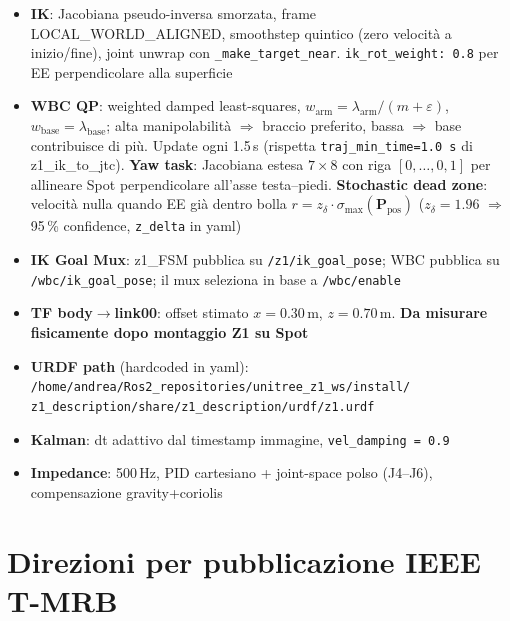 \documentclass[a4paper,11pt]{article}
\begin{document}
\begin{itemize}
  \item \textbf{IK}: Jacobiana pseudo-inversa smorzata, frame LOCAL\_WORLD\_ALIGNED,
        smoothstep quintico (zero velocità a inizio/fine),
        joint unwrap con \texttt{\_make\_target\_near}.
        \texttt{ik\_rot\_weight: 0.8} per EE perpendicolare alla superficie
  \item \textbf{WBC QP}: weighted damped least-squares,
        $w_{\text{arm}} = \lambda_{\text{arm}} / (m + \varepsilon)$,
        $w_{\text{base}} = \lambda_{\text{base}}$;
        alta manipolabilità $\Rightarrow$ braccio preferito, bassa $\Rightarrow$ base contribuisce di più.
        Update ogni 1.5\,s (rispetta \texttt{traj\_min\_time=1.0\,s} di z1\_ik\_to\_jtc).
        \textbf{Yaw task}: Jacobiana estesa $7\times8$ con riga
        $[0,\ldots,0,1]$ per allineare Spot perpendicolare all'asse testa--piedi.
        \textbf{Stochastic dead zone}: velocità nulla quando EE già dentro bolla
        $r = z_\delta \cdot \sigma_{\max}(\mathbf{P}_{\text{pos}})$
        ($z_\delta=1.96$ $\Rightarrow$ 95\,\% confidence, \texttt{z\_delta} in yaml)
  \item \textbf{IK Goal Mux}: z1\_FSM pubblica su \texttt{/z1/ik\_goal\_pose};
        WBC pubblica su \texttt{/wbc/ik\_goal\_pose};
        il mux seleziona in base a \texttt{/wbc/enable}
  \item \textbf{TF body$\to$link00}: offset stimato $x=0.30$\,m, $z=0.70$\,m.
        \textbf{Da misurare fisicamente dopo montaggio Z1 su Spot}
  \item \textbf{URDF path} (hardcoded in yaml): \\
        \texttt{/home/andrea/Ros2\_repositories/unitree\_z1\_ws/install/}\\
        \texttt{z1\_description/share/z1\_description/urdf/z1.urdf}
  \item \textbf{Kalman}: dt adattivo dal timestamp immagine,
        \texttt{vel\_damping = 0.9}
  \item \textbf{Impedance}: 500\,Hz, PID cartesiano + joint-space polso (J4--J6),
        compensazione gravity+coriolis
\end{itemize}

\section{Direzioni per pubblicazione IEEE T-MRB}
\end{document}
